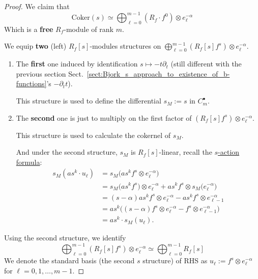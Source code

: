 \begin{proof}
    We claim that
    \[
        \mathrm{Coker}(s) \simeq \bigoplus_{\ell=0}^{m-1} \left(R_{f} \cdot f^{0}\right) \otimes e_{\ell}^{-\alpha}
    \]
    Which is a \textbf{free} $R_f$-module of rank $m$.

    We equip \textbf{two} (left) $R_f[s]$-modules structures on $\bigoplus_{\ell=0}^{m-1} \left(R_{f}[s]f^{s}\right) \otimes e_{\ell}^{-\alpha}$.
    \begin{enumerate}
        \item The \textbf{first} one induced by identification $s\mapsto -t\partial_t$ (still different with the previous section Sect.~\ref{sect:Bjork_s_approach_to_existence_of_b-functions}'s $-\partial_t {t}$).

              This structure is used to define the differential $s_M := s$ in $C_m^\bullet$.

        \item The \textbf{second} one is just to multiply on the first factor of $\left(R_{f}[s]f^{s}\right) \otimes e_{\ell}^{-\alpha}$.

              This structure is used to calculate the cokernel of $s_M$.

              And under the second structure, $s_M$ is $R_f[s]$-linear, recall the \hyperref[eq:s_action_on_N_m_alpha_k]{$s$-action formula}:
              \begin{align*}
                  s_M(a s^k \cdot u_\ell) & = s_M\big(as^k f^s \otimes e_\ell^{-\alpha}\big)                                                  \\
                                          & = s_M\big(as^k f^s\big) \otimes e_\ell^{-\alpha} + as^k f^s \otimes s_M\big(e_\ell^{-\alpha}\big) \\
                                          & =(s - \alpha)as^k f^s \otimes e_\ell^{-\alpha} - as^k f^s \otimes e_{\ell-1}^{-\alpha}            \\
                                          & = as^k\big((s - \alpha)f^s \otimes e_\ell^{-\alpha} - f^s \otimes e_{\ell-1}^{-\alpha}\big)       \\
                                          & = as^k \cdot s_M(u_\ell).
              \end{align*}
    \end{enumerate}
    Using the second structure, we identify
    \[
        \bigoplus_{\ell=0}^{m-1} \left(R_{f}[s]f^{s}\right) \otimes e_{\ell}^{-\alpha} \simeq \bigoplus_{\ell=0}^{m-1} R_{f}[s]
    \]
    We denote the standard basis (the second $s$ structure) of RHS as $u_\ell := f^s \otimes e^{-\alpha}_\ell$ for $\ell = 0, 1, \dots, m-1$.


\end{proof}
